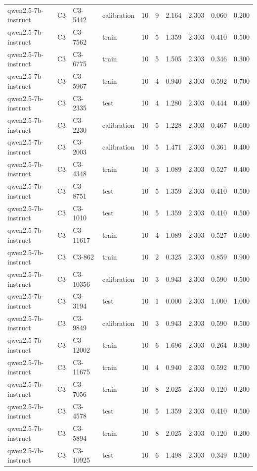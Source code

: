 \begin{table}
\begin{tabular}{llllrrrrrr}
qwen2.5-7b-instruct & C3 & C3-5442 & calibration & 10 & 9 & 2.164 & 2.303 & 0.060 & 0.200 \\
qwen2.5-7b-instruct & C3 & C3-7562 & train & 10 & 5 & 1.359 & 2.303 & 0.410 & 0.500 \\
qwen2.5-7b-instruct & C3 & C3-6775 & train & 10 & 5 & 1.505 & 2.303 & 0.346 & 0.300 \\
qwen2.5-7b-instruct & C3 & C3-5967 & train & 10 & 4 & 0.940 & 2.303 & 0.592 & 0.700 \\
qwen2.5-7b-instruct & C3 & C3-2335 & test & 10 & 4 & 1.280 & 2.303 & 0.444 & 0.400 \\
qwen2.5-7b-instruct & C3 & C3-2230 & calibration & 10 & 5 & 1.228 & 2.303 & 0.467 & 0.600 \\
qwen2.5-7b-instruct & C3 & C3-2003 & calibration & 10 & 5 & 1.471 & 2.303 & 0.361 & 0.400 \\
qwen2.5-7b-instruct & C3 & C3-4348 & train & 10 & 3 & 1.089 & 2.303 & 0.527 & 0.400 \\
qwen2.5-7b-instruct & C3 & C3-8751 & test & 10 & 5 & 1.359 & 2.303 & 0.410 & 0.500 \\
qwen2.5-7b-instruct & C3 & C3-1010 & test & 10 & 5 & 1.359 & 2.303 & 0.410 & 0.500 \\
qwen2.5-7b-instruct & C3 & C3-11617 & train & 10 & 4 & 1.089 & 2.303 & 0.527 & 0.600 \\
qwen2.5-7b-instruct & C3 & C3-862 & train & 10 & 2 & 0.325 & 2.303 & 0.859 & 0.900 \\
qwen2.5-7b-instruct & C3 & C3-10356 & calibration & 10 & 3 & 0.943 & 2.303 & 0.590 & 0.500 \\
qwen2.5-7b-instruct & C3 & C3-3194 & test & 10 & 1 & 0.000 & 2.303 & 1.000 & 1.000 \\
qwen2.5-7b-instruct & C3 & C3-9849 & calibration & 10 & 3 & 0.943 & 2.303 & 0.590 & 0.500 \\
qwen2.5-7b-instruct & C3 & C3-12002 & train & 10 & 6 & 1.696 & 2.303 & 0.264 & 0.300 \\
qwen2.5-7b-instruct & C3 & C3-11675 & train & 10 & 4 & 0.940 & 2.303 & 0.592 & 0.700 \\
qwen2.5-7b-instruct & C3 & C3-7056 & train & 10 & 8 & 2.025 & 2.303 & 0.120 & 0.200 \\
qwen2.5-7b-instruct & C3 & C3-4578 & test & 10 & 5 & 1.359 & 2.303 & 0.410 & 0.500 \\
qwen2.5-7b-instruct & C3 & C3-5894 & train & 10 & 8 & 2.025 & 2.303 & 0.120 & 0.200 \\
qwen2.5-7b-instruct & C3 & C3-10925 & test & 10 & 6 & 1.498 & 2.303 & 0.349 & 0.500 \\

\end{tabular}
\end{table}
